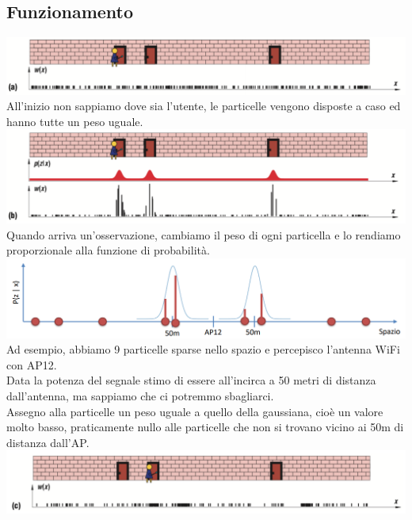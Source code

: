 \subsection{Funzionamento}
\includegraphics[width=\textwidth]{images/MobiDEV/2. tecniche di aggregazione di dati soggetti a rumore/particle filter 1.PNG}
All'inizio non sappiamo dove sia l'utente, le particelle vengono disposte a caso ed hanno tutte un peso uguale. \\
\includegraphics[width=\textwidth]{images/MobiDEV/2. tecniche di aggregazione di dati soggetti a rumore/particle filter 2.PNG}
Quando arriva un'osservazione, cambiamo il peso di ogni particella e lo rendiamo proporzionale alla funzione di probabilità. \\
\includegraphics[width=\textwidth]{images/MobiDEV/2. tecniche di aggregazione di dati soggetti a rumore/particle filter_.PNG}
Ad esempio, abbiamo 9 particelle sparse nello spazio e percepisco l'antenna WiFi con AP12. 
\\ Data la potenza del segnale stimo di essere all'incirca a 50 metri di distanza dall'antenna, ma sappiamo che ci potremmo sbagliarci. 
\\ Assegno alla particelle un peso uguale a quello della gaussiana, cioè un valore molto basso, praticamente nullo alle particelle che non si trovano vicino ai 50m di distanza dall'AP. \\
\includegraphics[width=\textwidth]{images/MobiDEV/2. tecniche di aggregazione di dati soggetti a rumore/particle filter 3.PNG}
